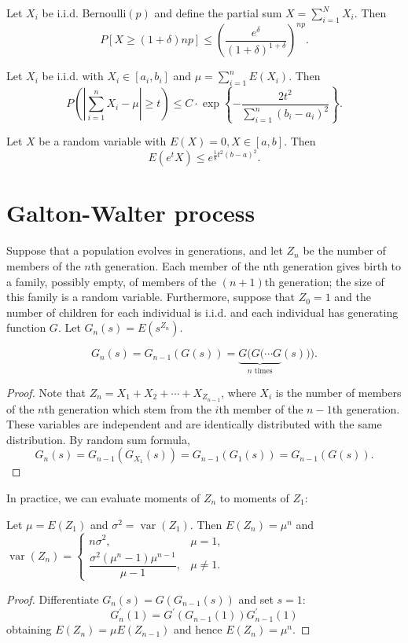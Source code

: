 \documentclass[11pt,singlecolumn, openany, citestyle=authoryear]{elegantbook}
\begin{document}
\begin{CJK}{UTF8}{gbsn}
\begin{theorem}
    Let $X_i$ be i.i.d. Bernoulli$(p)$ and define the partial sum $X=\displaystyle 
    \sum_{i=1}^N X_i$. Then 
    $$
    P[X\geqslant (1+\delta)np]\leqslant \left(
        \frac{e^\delta}{(1+\delta)^{1+\delta}}
    \right)^{np}.
    $$
\end{theorem}
\begin{theorem}
    Let $X_i$ be i.i.d. with $X_i\in [a_i,b_i]$ and $\mu = \displaystyle
    \sum_{i=1}^n E(X_i)$. Then
    $$
    P(|\sum_{i=1}^n X_i-\mu|\geqslant t)\leqslant C\cdot \operatorname{exp}\left\{
        -\frac{2t^2}{\sum_{i=1}^n (b_i-a_i)^2}
    \right\}.
    $$
\end{theorem}
\begin{lemma}
    Let $X$ be a random variable with $E(X)=0, X\in [a,b]$. Then 
    $$
    E(e^tX)\leqslant e^{\frac{1}{8}t^2(b-a)^2}.
    $$
\end{lemma}

\section{Galton-Walter process}
Suppose that a population evolves in generations, and let $Z_n$ be the
number of members of the $n$th generation. Each member of the nth generation gives birth to
a family, possibly empty, of members of the $(n + 1)$th generation; the size of this family is a
random variable.
Furthermore, suppose that $Z_0=1$ and the number of children for each individual is i.i.d.
and each individual has generating function $G$. Let $G_n(s)=E(s^{Z_n})$.
\begin{lemma}
    $$
    G_n(s)=G_{n-1}(G(s)) = \underbrace{G(G(\cdots G}_{n \text{ times}}(s))).
    $$
\end{lemma}
\begin{proof}
    Note that $Z_n=X_1+X_2+\cdots+X_{Z_{n-1}}$,
    where $X_i$
    is the number of members of the $n$th generation 
    which stem from the $i$th member of the $n-1$th generation.
    These variables are independent and are identically distributed with the same distribution.
    By random sum formula,
    $$
    G_n(s)=G_{n-1}(G_{X_1}(s))=G_{n-1}({G_1}(s)) = G_{n-1}(G(s)).
    $$
\end{proof}
In practice, we can evaluate moments of $Z_n$ to moments of $Z_1$:
\begin{lemma}
    Let $\mu = E(Z_1)$ and $\sigma^2 = \operatorname{var}(Z_1)$. Then 
    $E(Z_n)=\mu^n$ and $\operatorname{var}(Z_n)=
    \begin{cases}
        n\sigma^2, & \mu = 1,\\
        \dfrac{\sigma^2(\mu^n-1)\mu^{n-1}}{\mu-1}, &\mu\neq1.
    \end{cases}$
\end{lemma}
\begin{proof}
    Differentiate $G_n(s)=G(G_{n-1}(s))$ and set $s=1$:
    $$
    G^\prime_n(1)=G^\prime (G_{n-1}(1)) G^\prime_{n-1}(1)
    $$
    obtaining 
    $E(Z_n)=\mu E(Z_{n-1})$ and hence $E(Z_n)=\mu^n$.


\end{proof}
\end{CJK}
\end{document}
